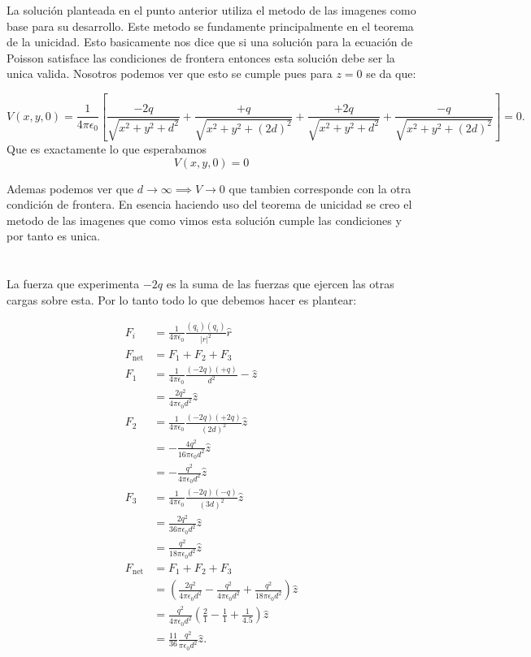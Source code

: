 \documentclass{report}
\begin{document}
La solución planteada en el punto anterior utiliza el metodo de las imagenes como base para su desarrollo. Este metodo se fundamente principalmente en el teorema de la unicidad. Esto basicamente nos dice que si una solución para la ecuación de Poisson satisface las condiciones de frontera entonces esta solución debe ser la unica valida. Nosotros podemos ver que esto se cumple pues para $z = 0$ se da que:

\[
V(x, y, 0) = \frac{1}{4\pi\epsilon_0} \left[
\frac{-2q}{\sqrt{x^2 + y^2 + d^2}} +
\frac{+q}{\sqrt{x^2 + y^2 + (2d)^2}} +
\frac{+2q}{\sqrt{x^2 + y^2 + d^2}} +
\frac{-q}{\sqrt{x^2 + y^2 + (2d)^2}}
\right] = 0.
\]
Que es exactamente lo que esperabamos
\[
V(x, y, 0) = 0
\]

Ademas podemos ver que $d\to \infty \implies V \to 0$ que tambien corresponde con la otra condición de frontera. En esencia haciendo uso del teorema de unicidad se creo el metodo de las imagenes que como vimos esta solución cumple las condiciones y por tanto es unica.

\section{}

La fuerza que experimenta $-2q$ es la suma de las fuerzas que ejercen las otras cargas sobre esta. Por lo tanto todo lo que debemos hacer es plantear:

\begin{align*}
  F_i &= \frac{1}{4\pi\epsilon_0} \frac{(q_i)(q_i)}{\left| r \right|^2} \hat{r}\\
  F_{\text{net}} &= F_1 + F_2 + F_3\\
  F_1 &= \frac{1}{4\pi\epsilon_0} \frac{(-2q)(+q)}{d^2} - \hat{z}\\
  &= \frac{2q^2}{4\pi\epsilon_0 d^2} \hat{z}\\
  F_2 &= \frac{1}{4\pi\epsilon_0} \frac{(-2q)(+2q)}{(2d)^2} \hat{z}\\ 
  &= -\frac{4q^2}{16\pi\epsilon_0 d^2} \hat{z}\\ 
  &= -\frac{q^2}{4\pi\epsilon_0 d^2} \hat{z}\\
  F_3 &=  \frac{1}{4\pi\epsilon_0} \frac{(-2q)(-q)}{(3d)^2} \hat{z}\\
  &= \frac{2q^2}{36\pi\epsilon_0 d^2} \hat{z}\\
  &= \frac{q^2}{18\pi\epsilon_0 d^2} \hat{z}\\
  F_{\text{net}} &= F_1 + F_2 + F_3\\
  &= \left( \frac{2q^2}{4\pi\epsilon_0 d^2} - \frac{q^2}{4\pi\epsilon_0 d^2} + \frac{q^2}{18\pi\epsilon_0 d^2} \right) \hat{z}\\
  &= \frac{q^2}{4\pi\epsilon_0 d^2} \left( \frac{2}{1} - \frac{1}{1} + \frac{1}{4.5} \right) \hat{z}\\
  &= \frac{11}{36} \frac{q^2}{\pi\epsilon_0 d^2} \hat{z}.
\end{align*}
\end{document}
